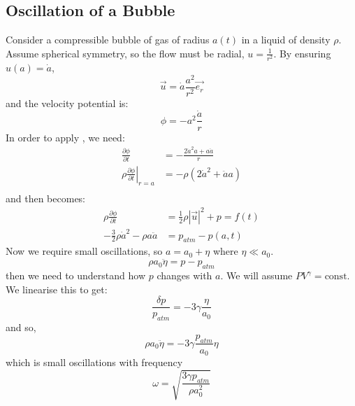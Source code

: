 \documentclass[../Main.tex]{subfiles}
\begin{document}
\subsection{Oscillation of a Bubble}
Consider a compressible bubble of gas of radius $a(t)$ in a liquid of density $\rho$. Assume spherical symmetry, so the flow must be radial, $u = \frac1{r^2}$. By ensuring $u(a) = \dot{a}$,
\begin{equation*}
    \vec{u} = \dot{a} \frac{a^2}{r^2} \vec{e_r}
\end{equation*}
and the velocity potential is:
\begin{equation*}
    \phi = -a^2 \frac{\dot{a}}{r}
\end{equation*}
In order to apply , we need:
\begin{align*}
    \frac{\partial \phi}{\partial t} &= -\frac{2\dot{a}^2 a + a \ddot{a}}{r} \\
    \left.\rho \frac{\partial \phi}{\partial t} \right|_{r = a} &= -\rho \left(2\dot{a}^2 + \ddot{a} a\right) \\
\end{align*}
and then  becomes:
\begin{align*}
    \rho \frac{\partial \phi}{\partial t} &= \frac12 \rho |\vec{u}|^2 + p = f(t) \\
    -\frac32 \rho \dot{a}^2 - \rho a \ddot{a} &= p_{atm} - p(a, t)
\end{align*}
Now we require small oscillations, so $a = a_0 + \eta$ where $\eta \ll a_0$.
\begin{equation*}
    \rho a_0 \ddot{\eta} = p - p_{atm}
\end{equation*}
then we need to understand how $p$ changes with $a$. We will assume $PV^{\gamma} = \text{const}$. We linearise this to get:
\begin{equation*}
    \frac{\delta p}{p_{atm}} = -3\gamma \frac{\eta}{a_0}
\end{equation*}
and so,
\begin{equation*}
    \rho a_0 \ddot{\eta} = -3\gamma \frac{p_{atm}}{a_0} \eta
\end{equation*}
which is small oscillations with frequency
\begin{equation*}
    \omega = \sqrt{\frac{3\gamma p_{atm}}{\rho a_0^2}}
\end{equation*}
\end{document}
